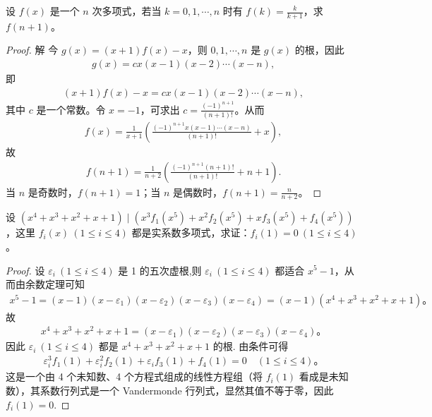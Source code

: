\documentclass[../../main.tex]{subfiles}%
\begin{document}
\begin{example}
设 $f(x)$ 是一个 $n$ 次多项式，若当 $k = 0, 1, \cdots, n$ 时有 $f(k) = \frac{k}{k + 1}$，求 $f(n + 1)$。
\end{example}
\begin{proof}
解 今 $g(x) = (x + 1)f(x) - x$，则 $0, 1, \cdots, n$ 是 $g(x)$ 的根，因此
\begin{align*}
g(x) = c x(x - 1)(x - 2) \cdots (x - n),
\end{align*}
即
\begin{align*}
(x + 1)f(x) - x = c x(x - 1)(x - 2) \cdots (x - n),
\end{align*}
其中 $c$ 是一个常数。令 $x = -1$，可求出 $c = \frac{(-1)^{n+1}}{(n + 1)!}$。从而
\begin{align*}
f(x) = \frac{1}{x + 1} \left( \frac{(-1)^{n+1} x(x - 1) \cdots (x - n)}{(n + 1)!} + x \right),
\end{align*}
故
\begin{align*}
f(n + 1) = \frac{1}{n + 2} \left( \frac{(-1)^{n+1} (n + 1)!}{(n + 1)!} + n + 1 \right).
\end{align*}
当 $n$ 是奇数时，$f(n + 1) = 1$；当 $n$ 是偶数时，$f(n + 1) = \frac{n}{n + 2}$。
\end{proof}

\begin{example}
设 $(x^4 + x^3 + x^2 + x + 1) \mid (x^3 f_1(x^5) + x^2 f_2(x^5) + x f_3(x^5) + f_4(x^5))$，这里 $f_i(x) \ (1 \leqslant  i \leqslant  4)$ 都是实系数多项式，求证：$f_i(1) = 0 \ (1 \leqslant  i \leqslant  4)$。
\end{example}
\begin{proof}
设 $\varepsilon_i \ (1 \leqslant  i \leqslant  4)$ 是 1 的五次虚根,则 $\varepsilon_i \ (1 \leqslant  i \leqslant  4)$ 都适合 $x^5 - 1$，从而由余数定理可知
\begin{align*}
x^5 - 1 = (x - 1)(x - \varepsilon_1)(x - \varepsilon_2)(x - \varepsilon_3)(x - \varepsilon_4) = (x - 1)(x^4 + x^3 + x^2 + x + 1)。
\end{align*}
故
\begin{align*}
x^4 + x^3 + x^2 + x + 1 = (x - \varepsilon_1)(x - \varepsilon_2)(x - \varepsilon_3)(x - \varepsilon_4)。
\end{align*}
因此 $\varepsilon_i \ (1 \leqslant  i \leqslant  4)$ 都是 $x^4 + x^3 + x^2 + x + 1$ 的根.
由条件可得
\begin{align*}
\varepsilon_i^3 f_1(1) + \varepsilon_i^2 f_2(1) + \varepsilon_i f_3(1) + f_4(1) = 0 \quad (1 \leqslant  i \leqslant  4)。
\end{align*}
这是一个由 4 个未知数、4 个方程式组成的线性方程组（将 $f_i(1)$ 看成是未知数），其系数行列式是一个 Vandermonde 行列式，显然其值不等于零，因此 $f_i(1) = 0$.
\end{proof}
\end{document}
